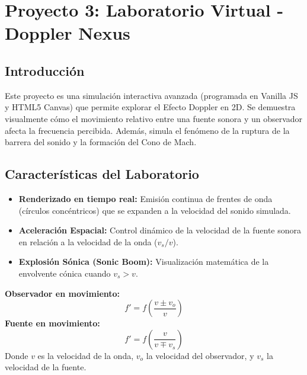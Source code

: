 \documentclass[12pt,a4paper]{article}
\begin{document}
\section{Proyecto 3: Laboratorio Virtual - Doppler Nexus}
\subsection{Introducción}
Este proyecto es una simulación interactiva avanzada (programada en Vanilla JS y HTML5 Canvas) que permite explorar el Efecto Doppler en 2D. Se demuestra visualmente cómo el movimiento relativo entre una fuente sonora y un observador afecta la frecuencia percibida. Además, simula el fenómeno de la ruptura de la barrera del sonido y la formación del Cono de Mach.

\subsection{Características del Laboratorio}
\begin{itemize}
    \item \textbf{Renderizado en tiempo real:} Emisión continua de frentes de onda (círculos concéntricos) que se expanden a la velocidad del sonido simulada.
    \item \textbf{Aceleración Espacial:} Control dinámico de la velocidad de la fuente sonora en relación a la velocidad de la onda ($v_s / v$).
    \item \textbf{Explosión Sónica (Sonic Boom):} Visualización matemática de la envolvente cónica cuando $v_s > v$.
\end{itemize}

\begin{tcolorbox}[colback=purple!5!white,colframe=purple!75!black,title=Fórmulas Implementadas]
\textbf{Observador en movimiento:} 
\[ f' = f \left( \frac{v \pm v_o}{v} \right) \]
\textbf{Fuente en movimiento:}
\[ f' = f \left( \frac{v}{v \mp v_s} \right) \]
Donde $v$ es la velocidad de la onda, $v_o$ la velocidad del observador, y $v_s$ la velocidad de la fuente.
\end{tcolorbox}
\end{document}
